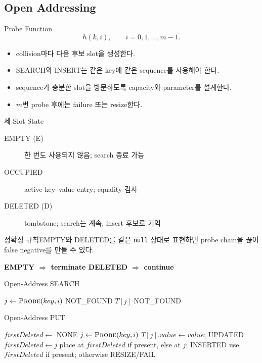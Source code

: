 \subsection{Open Addressing}
\begin{frame}{Probe Function}
\[
h(k,i),\qquad i=0,1,\ldots,m-1.
\]
\begin{itemize}\item collision마다 다음 후보 slot을 생성한다.\item SEARCH와 INSERT는 같은 key에 같은 sequence를 사용해야 한다.\item sequence가 충분한 slot을 방문하도록 capacity와 parameter를 설계한다.\item $m$번 probe 후에는 failure 또는 resize한다.\end{itemize}
\end{frame}
\begin{frame}{세 Slot State}
\begin{center}\htlegend\end{center}
\begin{description}
\item[EMPTY (E)] 한 번도 사용되지 않음; search 종료 가능
\item[OCCUPIED] active key--value entry; equality 검사
\item[DELETED (D)] tombstone; search는 계속, insert 후보로 기억
\end{description}
\begin{alertblock}{정확성 규칙}EMPTY와 DELETED를 같은 \texttt{null} 상태로 표현하면 probe chain을 끊어 false negative를 만들 수 있다.\end{alertblock}
\begin{center}\large\bfseries
\textcolor{AlgoBlue}{EMPTY $\Rightarrow$ terminate}\qquad
\textcolor{AlgoOrangeText}{DELETED $\Rightarrow$ continue}
\end{center}
\end{frame}
\begin{frame}{Open-Address SEARCH}
\small\begin{algorithmic}[1]
 \State $j\gets\Call{Probe}{key,i}$
 \State\Return NOT\_FOUND\EndIf
   \State\Return $T[j]$
 \EndIf
\EndFor
\State\Return NOT\_FOUND
\EndProcedure
\end{algorithmic}
\end{frame}
\begin{frame}{Open-Address PUT}
\algofont\begin{algorithmic}[1]
\State $firstDeleted\gets$ NONE
 \State $j\gets\Call{Probe}{key,i}$
   \State $T[j].value\gets value$; \Return UPDATED
   \State $firstDeleted\gets j$
   \State place at $firstDeleted$ if present, else at $j$; \Return INSERTED
 \EndIf
\EndFor
\State use $firstDeleted$ if present; otherwise RESIZE/FAIL
\EndProcedure
\end{algorithmic}
\end{frame}
